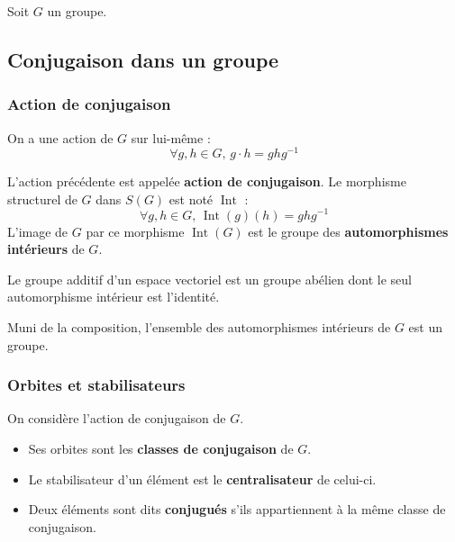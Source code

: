 




  Soit $G$ un groupe.

  \subsection{Conjugaison dans un groupe}

  \subsubsection{Action de conjugaison}


  \begin{lemma}
    On a une action de $G$ sur lui-même :
    \[ \forall g, h \in G, \, g \cdot h = ghg^{-1} \]
  \end{lemma}

  \begin{definition}
    L'action précédente est appelée \textbf{action de conjugaison}. Le morphisme structurel de $G$ dans $S(G)$ est noté $\operatorname{Int}$ :
    \[ \forall g, h \in G, \, \operatorname{Int}(g)(h) = ghg^{-1} \]
    L'image de $G$ par ce morphisme $\operatorname{Int}(G)$ est le groupe des \textbf{automorphismes intérieurs} de $G$.
  \end{definition}


  \begin{example}
    Le groupe additif d'un espace vectoriel est un groupe abélien dont le seul automorphisme intérieur est l'identité.
  \end{example}


  \begin{proposition}
    Muni de la composition, l'ensemble des automorphismes intérieurs de $G$ est un groupe.
  \end{proposition}

  \subsubsection{Orbites et stabilisateurs}


  \begin{definition}
    On considère l'action de conjugaison de $G$.
    \begin{itemize}
      \item Ses orbites sont les \textbf{classes de conjugaison} de $G$.
      \item Le stabilisateur d'un élément est le \textbf{centralisateur} de celui-ci.
      \item Deux éléments sont dits \textbf{conjugués} s'ils appartiennent à la même classe de conjugaison.
    \end{itemize}
  \end{definition}

